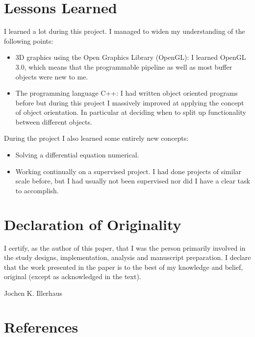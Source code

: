 \documentclass[a4paper,onesided,10pt]{article}
\begin{document}
\section{Lessons Learned}
I learned a lot during this project. I managed to widen my understanding of the following points:
\begin{itemize}
	\item 3D graphics using the Open Graphics Library (OpenGL): I learned OpenGL 3.0, which means that the programmable pipeline as well as most buffer objects were new to me.
	\item The programming language C++: I had written object oriented programs before but during this project I massively improved at applying the concept of object orientation. In particular at deciding when to split up functionality between different objects.
\end{itemize}
During the project I also learned some entirely new concepts:
\begin{itemize}
	\item Solving a differential equation numerical.
	\item Working continually on a supervised project. I had done projects of similar scale before, but I had usually not been supervised nor did I have a clear task to accomplish.
\end{itemize}


\clearpage
\section{Declaration of Originality}
I certify, as the author of this paper, that I was the
person primarily involved in the study designs, implementation, analysis and manuscript preparation. I
declare that the work presented in the paper is to the best of my knowledge and belief, original (except as acknowledged in the text).\\

\vspace*{15mm}

Jochen K. Illerhaus\\

\clearpage
\section{References}
\nocite{*} %


%

\appendix
\end{document}
